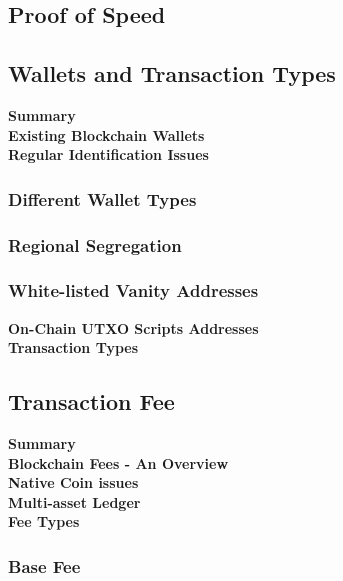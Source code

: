 \documentclass[letterpaper,11pt]{article}
\begin{document}
\subsection{Proof of Speed}


\subsection{Wallets and Transaction Types}

\textbf{Summary}\\

\textbf{Existing Blockchain Wallets}\\

\textbf{Regular Identification Issues}\\

\subsubsection{Different Wallet Types}

\subsubsection{Regional Segregation}

\subsubsection{White-listed Vanity Addresses}

\textbf{On-Chain UTXO Scripts Addresses}\\

\textbf{Transaction Types}\\

\subsection{Transaction Fee}

\textbf{Summary}\\

\textbf{Blockchain Fees - An Overview}\\

\textbf{Native Coin issues}\\

\textbf{Multi-asset Ledger}\\

\textbf{Fee Types}\\

\subsubsection{Base Fee}
\end{document}
